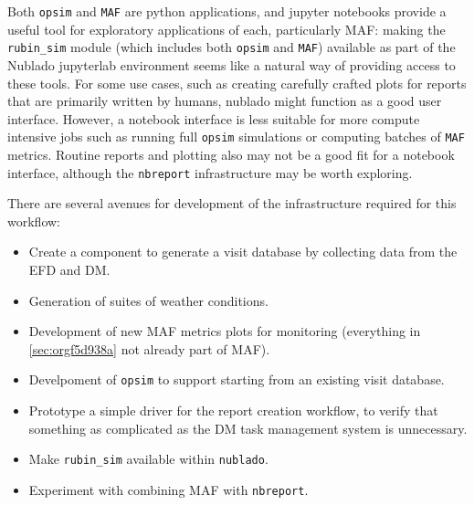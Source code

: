 Both \texttt{opsim} and \texttt{MAF} are python applications, and jupyter notebooks provide a useful tool for exploratory applications of each, particularly MAF: making the \texttt{rubin\_sim} module (which includes both \texttt{opsim} and \texttt{MAF}) available as part of the Nublado jupyterlab environment seems like a natural way of providing access to these tools. For some use cases, such as creating carefully crafted plots for reports that are primarily written by humans, nublado might function as a good user interface. However, a notebook interface is less suitable for more compute intensive jobs such as running full \texttt{opsim} simulations or computing batches of \texttt{MAF} metrics. Routine reports and plotting also may not be a good fit for a notebook interface, although the \texttt{nbreport} infrastructure may be worth exploring.

There are several avenues for development of the infrastructure required for this workflow:
\begin{itemize}
\item Create a component to generate a visit database by collecting data from the EFD and DM.
\item Generation of suites of weather conditions.
\item Development of new MAF metrics plots for monitoring (everything in \ref{sec:orgf5d938a} not already part of MAF).
\item Develpoment of \texttt{opsim} to support starting from an existing visit database.
\item Prototype a simple driver for the report creation workflow, to verify that something as complicated as the DM task management system is unnecessary.
\item Make \texttt{rubin\_sim} available within \texttt{nublado}.
\item Experiment with combining MAF with \texttt{nbreport}.
\end{itemize}
